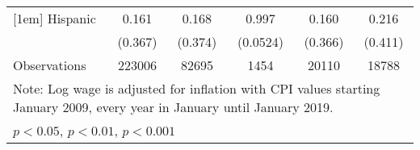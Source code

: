 \begin{table}[htbp]
\begin{tabular}{l*{5}{c}}
[1em]
Hispanic            &       0.161         &       0.168         &       0.997         &       0.160         &       0.216         \\
                    &     (0.367)         &     (0.374)         &    (0.0524)         &     (0.366)         &     (0.411)         \\
\hline
Observations        &      223006         &       82695         &        1454         &       20110         &       18788         \\
\hline\hline
\multicolumn{6}{l}{\footnotesize Note: Log wage is adjusted for inflation with CPI values starting January 2009, every year in January until January 2019.}\\
\multicolumn{6}{l}{\footnotesize \sym{*} \(p<0.05\), \sym{**} \(p<0.01\), \sym{***} \(p<0.001\)}\\
\end{tabular}
\end{table}
